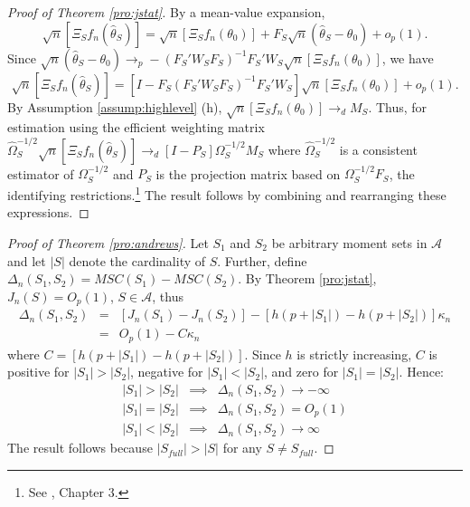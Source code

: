 \documentclass[12pt]{article}
\theoremstyle{definition}
\begin{document}
\begin{proof}[Proof of Theorem \ref{pro:jstat}]
By a mean-value expansion,
	$$\sqrt{n}\left[\Xi_S f_n\left(\widehat{\theta}_S\right)\right]  = \sqrt{n}\left[\Xi_S f_n(\theta_0)\right] + F_S  \sqrt{n}\left(\widehat{\theta}_S - \theta_0\right) + o_p(1).$$
Since $\sqrt{n}\left(\widehat{\theta}_S - \theta_0\right) \rightarrow_p -\left(F_S' W_S F_S  \right)^{-1}F_S'W_S\sqrt{n}\left[\Xi_S f_n(\theta_0)\right]$, we have
	$$\sqrt{n}\left[\Xi_S f_n(\widehat{\theta}_S)\right] = \left[I - F_S\left(F_S' W_S F_S  \right)^{-1}F_S'W_S\right] \sqrt{n}\left[\Xi_S f_n(\theta_0)\right] + o_p(1).$$
By Assumption \ref{assump:highlevel} (h), $\sqrt{n}\left[\Xi_S f_n(\theta_0)\right] \rightarrow_d M_S$. Thus, for estimation using the efficient weighting matrix $\widehat{\Omega}^{-1/2}_S \sqrt{n}\left[\Xi_S f_n\left(\widehat{\theta}_S\right)\right] \rightarrow_d\left[I - P_S\right] \Omega_S^{-1/2}M_S$ where $\widehat{\Omega}^{-1/2}_S$ is a consistent estimator of $\Omega_S^{-1/2}$ and $P_S$ is the projection matrix based on $\Omega^{-1/2}_S F_S$, the identifying restrictions.\footnote{See \cite{Hallbook}, Chapter 3.} The result follows by combining and rearranging these expressions.
\end{proof}



\begin{proof}[Proof of Theorem \ref{pro:andrews}]
Let $S_1$ and $S_2$ be arbitrary moment sets in $\mathcal{A}$ and let $|S|$ denote the cardinality of $S$. Further, define $\Delta_n(S_1, S_2) = MSC(S_1) - MSC(S_2)$. By Theorem \ref{pro:jstat}, $J_n(S) = O_p(1)$, $S \in \mathcal{A}$, thus
	\begin{eqnarray*}
			\Delta_n(S_1, S_2)	&=&   \left[J_{n}(S_1) - J_{n}(S_2)\right] - \left[h\left(p+|S_1|\right) - h\left(p+|S_2|\right)\right]\kappa_n\\
				&=& O_p(1) - C\kappa_n
	\end{eqnarray*}
where $C = \left[h\left(p+|S_1|\right) - h\left(p+|S_2|\right)\right]$. Since $h$ is strictly increasing, $C$ is positive for $|S_1|>|S_2|$, negative for $|S_1|<|S_2|$, and zero for $|S_1|=|S_2|$. Hence:
	\begin{eqnarray*}
		|S_1|>|S_2|&\implies& \Delta_n(S_1, S_2)  \rightarrow -\infty\\
		|S_1|=|S_2|&\implies&\Delta_n(S_1, S_2)  = O_p(1)\\
		|S_1|<|S_2|&\implies& \Delta_n(S_1, S_2)  \rightarrow \infty
\end{eqnarray*}
The result follows because $|S_{full}|>|S|$ for any $S \neq S_{full}$.
\end{proof}
\end{document}
